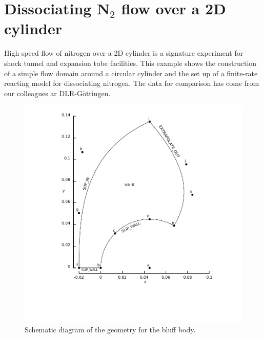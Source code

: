 
\section{Dissociating N$_2$ flow over a 2D cylinder}
\label{sec:n90}
%
High speed flow of nitrogen over a 2D cylinder is a signature experiment for shock tunnel
and expansion tube facilities.
This example shows the construction of a simple flow domain around a circular cylinder
and the set up of a finite-rate reacting model for dissociating nitrogen.
The data for comparison has come from our colleagues ar DLR-G\"{o}ttingen.

\begin{figure}[htbp]
\begin{center}
\includegraphics[width=12cm,viewport=76 80 391 439,clip=true]{../2D/n90/n90-schematic.pdf}
\end{center}
\caption{Schematic diagram of the geometry for the bluff body.}
\label{n90-geometry-fig}
\end{figure}


